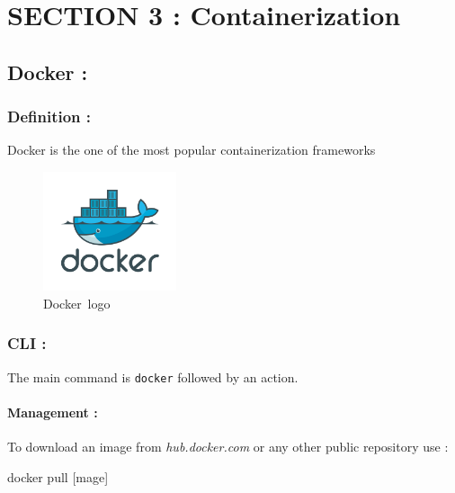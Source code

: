 \documentclass[
  14pt,
  english,
  a4paper,
]{scrreprt}
\newenvironment{Shaded}{}{}
\newcommand{\ExtensionTok}[1]{#1}
\newcommand{\NormalTok}[1]{#1}
\begin{document}
\hypertarget{section-3-containerization}{%
\section{SECTION 3 :
Containerization}\label{section-3-containerization}}

\hypertarget{docker}{%
\subsection{Docker :}\label{docker}}

\hypertarget{definition-8}{%
\subsubsection{Definition :}\label{definition-8}}

Docker is the one of the most popular containerization frameworks

\begin{figure}
\centering
\includegraphics[width=0.35\textwidth,height=\textheight]{figures/Docker-logo.png}
\caption{Docker~logo}
\end{figure}

\hypertarget{cli-3}{%
\subsubsection{CLI :}\label{cli-3}}

The main command is \texttt{docker} followed by an action.

\hypertarget{management}{%
\paragraph*{Management :}\label{management}}

To download an image from \emph{hub.docker.com} or any other public
repository use :

\begin{Shaded}
\begin{Highlighting}[]
\ExtensionTok{docker}\NormalTok{ pull [mage]}
\end{Highlighting}
\end{Shaded}
\end{document}

